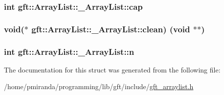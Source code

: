 \subsubsection[{\texorpdfstring{cap}{cap}}]{\setlength{\rightskip}{0pt plus 5cm}int gft\+::\+Array\+List\+::\+\_\+\+Array\+List\+::cap}\hypertarget{structgft_1_1ArrayList_1_1__ArrayList_a76c12c6e45ba96915e6ba9c1d31286fd}{}\label{structgft_1_1ArrayList_1_1__ArrayList_a76c12c6e45ba96915e6ba9c1d31286fd}
\subsubsection[{\texorpdfstring{clean}{clean}}]{\setlength{\rightskip}{0pt plus 5cm}void($\ast$ gft\+::\+Array\+List\+::\+\_\+\+Array\+List\+::clean) (void $\ast$$\ast$)}\hypertarget{structgft_1_1ArrayList_1_1__ArrayList_a964cc7d790fd0f0fe7606235e1ca4a35}{}\label{structgft_1_1ArrayList_1_1__ArrayList_a964cc7d790fd0f0fe7606235e1ca4a35}
\subsubsection[{\texorpdfstring{n}{n}}]{\setlength{\rightskip}{0pt plus 5cm}int gft\+::\+Array\+List\+::\+\_\+\+Array\+List\+::n}\hypertarget{structgft_1_1ArrayList_1_1__ArrayList_aabc5a9bbc1e57a7e7a9a31db2902df0d}{}\label{structgft_1_1ArrayList_1_1__ArrayList_aabc5a9bbc1e57a7e7a9a31db2902df0d}


The documentation for this struct was generated from the following file\+:\begin{DoxyCompactItemize}
\item 
/home/pmiranda/programming/lib/gft/include/\hyperlink{gft__arraylist_8h}{gft\+\_\+arraylist.\+h}\end{DoxyCompactItemize}
